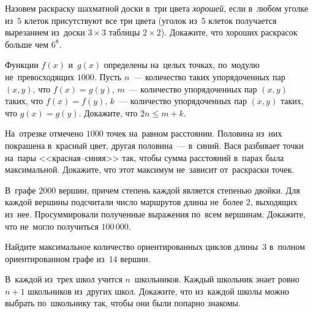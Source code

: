 


\begin{problems}

\item
Назовем раскраску шахматной доски в~три цвета \emph{хорошей}, если в~любом
уголке из~$5$ клеток присутствуют все три цвета (уголок из~$5$ клеток
получается вырезанием из~доски $3 \times 3$ таблицы $2 \times 2$).
Докажите, что хороших раскрасок больше чем $6^8$.

\item
Функции $f(x)$ и~$g(x)$ определены на~целых точках, по~модулю не~превосходящих
$1000$.
Пусть $n$~--- количество таких упорядоченных пар $(x, y)$, что $f(x) = g(y)$,
$m$~--- количество упорядоченных пар $(x, y)$ таких, что $f(x) = f(y)$,
$k$~--- количество упорядоченных пар $(x, y)$ таких, что $g(x) = g(y)$.
Докажите, что $2 n \leq m + k$.

\item
На~отрезке отмечено $1000$ точек на~равном расстоянии.
Половина из~них покрашена в~красный цвет, другая половина~--- в~синий.
Вася разбивает точки на~пары <<красная--синяя>> так, чтобы сумма расстояний
в~парах была максимальной.
Докажите, что этот максимум не~зависит от~раскраски точек.

\item
В~графе $2000$ вершин, причем степень каждой является степенью двойки.
Для каждой вершины подсчитали число маршрутов длины не~более $2$, выходящих
из~нее.
Просуммировали полученные выражения по~всем вершинам.
Докажите, что не~могло получиться $100\,000$.

\item
Найдите максимальное количество ориентированных циклов длины~$3$ в~полном
ориентированном графе из~$14$ вершин.

\item
В~каждой из~трех школ учится $n$~школьников.
Каждый школьник знает ровно $n + 1$ школьников из~других школ.
Докажите, что из~каждой школы можно выбрать по~школьнику так, чтобы они были
попарно знакомы.

\end{problems}

